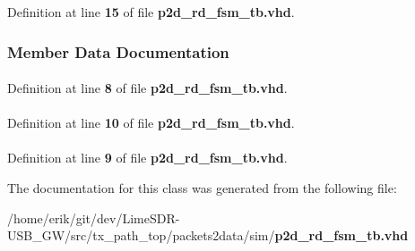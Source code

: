 Definition at line {\bf 15} of file {\bf p2d\+\_\+rd\+\_\+fsm\+\_\+tb.\+vhd}.



\subsubsection{Member Data Documentation}
\paragraph[{ieee}]{\hspace{0.3cm}{\ttfamily [Library]}}\label{classp2d__rd__fsm__tb_a0a6af6eef40212dbaf130d57ce711256}


Definition at line {\bf 8} of file {\bf p2d\+\_\+rd\+\_\+fsm\+\_\+tb.\+vhd}.

\paragraph[{numeric\+\_\+std}]{\hspace{0.3cm}{\ttfamily [Package]}}\label{classp2d__rd__fsm__tb_a2edc34402b573437d5f25fa90ba4013e}


Definition at line {\bf 10} of file {\bf p2d\+\_\+rd\+\_\+fsm\+\_\+tb.\+vhd}.

\paragraph[{std\+\_\+logic\+\_\+1164}]{\hspace{0.3cm}{\ttfamily [Package]}}\label{classp2d__rd__fsm__tb_acd03516902501cd1c7296a98e22c6fcb}


Definition at line {\bf 9} of file {\bf p2d\+\_\+rd\+\_\+fsm\+\_\+tb.\+vhd}.



The documentation for this class was generated from the following file\+:\begin{DoxyCompactItemize}
\item 
/home/erik/git/dev/\+Lime\+S\+D\+R-\/\+U\+S\+B\+\_\+\+G\+W/src/tx\+\_\+path\+\_\+top/packets2data/sim/{\bf p2d\+\_\+rd\+\_\+fsm\+\_\+tb.\+vhd}\end{DoxyCompactItemize}
